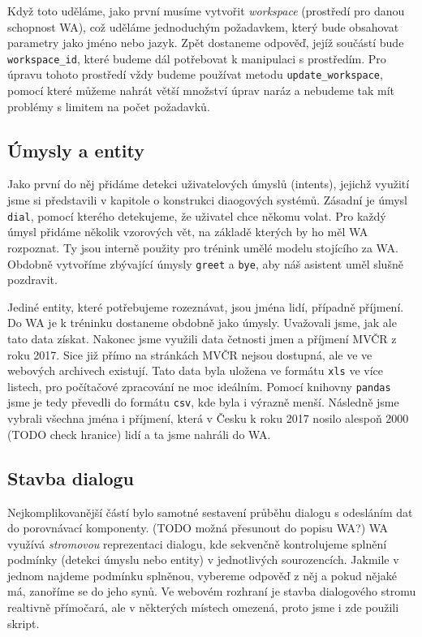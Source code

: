 Když toto uděláme, jako první musíme vytvořit \textit{workspace}
(prostředí pro danou schopnost WA), což uděláme
jednoduchým požadavkem, který bude obsahovat parametry jako jméno nebo jazyk.
Zpět dostaneme odpověď, jejíž součástí bude \texttt{workspace\_id}, které budeme
dál potřebovat k manipulaci s prostředím. Pro úpravu tohoto prostředí
vždy budeme používat metodu \texttt{update\_workspace}, pomocí které můžeme
nahrát větší množství úprav naráz a nebudeme tak mít problémy s limitem na
počet požadavků.

\subsection{Úmysly a entity}

Jako první do něj přidáme detekci uživatelových úmyslů (intents), jejichž využití
jsme si představili v kapitole o konstrukci diaogových systémů. Zásadní je úmysl
\texttt{dial}, pomocí kterého detekujeme, že uživatel chce někomu volat. Pro
každý úmysl přidáme několik vzorových vět, na základě kterých by ho měl WA
rozpoznat. Ty jsou interně použity pro trénink umělé modelu stojícího za WA.
Obdobně vytvoříme zbývající úmysly \texttt{greet} a \texttt{bye}, aby náš
asistent uměl slušně pozdravit.

Jediné entity, které potřebujeme rozeznávat, jsou jména lidí, případně příjmení.
Do WA je k tréninku dostaneme obdobně jako úmysly. Uvažovali jsme, jak ale tato
data získat. Nakonec jsme využili data četnosti jmen a příjmení MVČR z roku 2017.
Sice již přímo na stránkách MVČR nejsou dostupná, ale ve ve webových archivech
existují. Tato data byla uložena ve formátu \texttt{xls} ve více listech, pro
počítačové zpracování ne moc ideálním. Pomocí knihovny \texttt{pandas} jsme je
tedy převedli do formátu \texttt{csv}, kde byla i výrazně menší. Následně jsme
vybrali všechna jména i příjmení, která v Česku k roku 2017 nosilo alespoň
2000 (TODO check hranice) lidí a ta jsme nahráli do WA.

\subsection{Stavba dialogu}

Nejkomplikovanější částí bylo samotné sestavení průběhu dialogu s odesláním
dat do porovnávací komponenty. (TODO možná přesunout do popisu WA?) WA využívá \textit{stromovou} reprezentaci dialogu,
kde sekvenčně kontrolujeme splnění podmínky (detekci úmyslu nebo entity) v
jednotlivých sourozencích. Jakmile v jednom najdeme podmínku splněnou, vybereme
odpověď z něj a pokud nějaké má, zanoříme se do jeho synů. Ve webovém rozhraní je
stavba dialogového stromu realtivně přímočará, ale v některých místech omezená,
proto jsme i zde použili skript.

